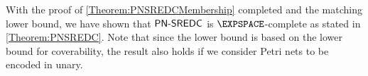 \documentclass[../../diss.tex]{subfiles}
\begin{document}
With the proof of \cref{Theorem:PNSREDCMembership} completed and the matching lower bound, we have shown that $\mathsf{PN\text{-}SREDC}$ is $\EXPSPACE$-complete as stated in \cref{Theorem:PNSREDC}.
Note that since the lower bound is based on the lower bound for coverability, the result also holds if we consider Petri nets to be encoded in unary.
\end{document}
